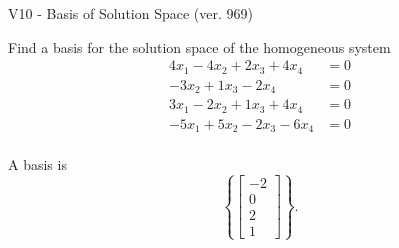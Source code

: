 \begin{exercise}
  \begin{exerciseTitle}V10 - Basis of Solution Space (ver. 969)\end{exerciseTitle}
  \begin{exerciseStatement}
    Find a basis for the solution space of the homogeneous system 
\begin{align*}
 4 x_ 1 -4 x_ 2 + 2 x_ 3 + 4 x_ 4 &= 0  \\ 
  -3 x_ 2 + 1 x_ 3 -2 x_ 4 &= 0  \\ 
  3 x_ 1 -2 x_ 2 + 1 x_ 3 + 4 x_ 4 &= 0  \\ 
  -5 x_ 1 + 5 x_ 2 -2 x_ 3 -6 x_ 4 &= 0  \\ 
 \end{align*}


 
  \end{exerciseStatement}

  \begin{exerciseAnswer}
   A basis is   
\[\left\{\left[\begin{array}{c}
-2 \\
0 \\
2 \\
1
\end{array}\right]\right\}.\]

  


  \end{exerciseAnswer}
\end{exercise}